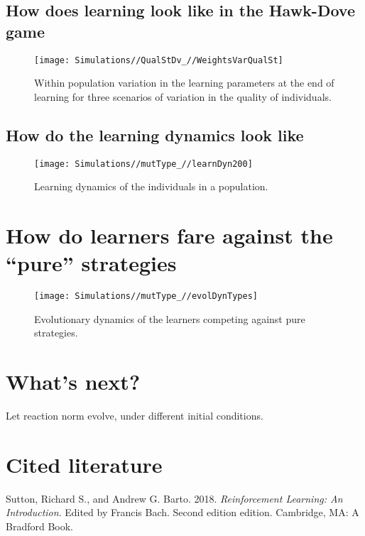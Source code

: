\documentclass[]{article}
\begin{document}
\subsection{How does learning look like in the Hawk-Dove
game}\label{how-does-learning-look-like-in-the-hawk-dove-game}

\begin{figure}
\texttt{[image: Simulations//QualStDv\_//WeightsVarQualSt]} \caption{\label{fig:AC_HD}Within population variation in the learning parameters at the end of learning for three scenarios of variation in the quality of individuals.}\label{fig:fig6}
\end{figure}

\subsection{How do the learning dynamics look
like}\label{how-do-the-learning-dynamics-look-like}

\begin{figure}
\texttt{[image: Simulations//mutType\_//learnDyn200]} \caption{\label{fig:learn_dyn}Learning dynamics of the individuals in a population.}\label{fig:fig7}
\end{figure}

\section{\texorpdfstring{How do learners fare against the ``pure''
strategies}{How do learners fare against the pure strategies}}\label{how-do-learners-fare-against-the-pure-strategies}

\begin{figure}
\texttt{[image: Simulations//mutType\_//evolDynTypes]} \caption{\label{fig:types_comp}Evolutionary dynamics of the learners competing against pure strategies.}\label{fig:fig8}
\end{figure}

\section{What's next?}\label{whats-next}

Let reaction norm evolve, under different initial conditions.

\section*{Cited literature}\label{cited-literature}

\hypertarget{refs}{}
\hypertarget{ref-sutton_reinforcement_2018}{}
Sutton, Richard S., and Andrew G. Barto. 2018. \emph{Reinforcement
Learning: An Introduction}. Edited by Francis Bach. Second edition
edition. Cambridge, MA: A Bradford Book.
\end{document}
